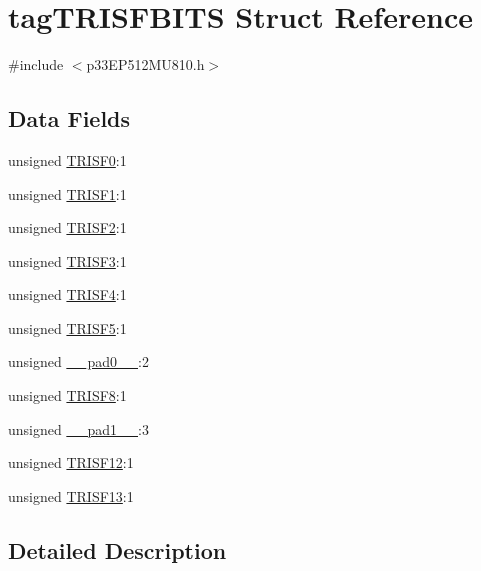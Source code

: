 \hypertarget{structtag_t_r_i_s_f_b_i_t_s}{}\section{tag\+T\+R\+I\+S\+F\+B\+I\+TS Struct Reference}
\label{structtag_t_r_i_s_f_b_i_t_s}


{\ttfamily \#include $<$p33\+E\+P512\+M\+U810.\+h$>$}

\subsection*{Data Fields}
\begin{DoxyCompactItemize}
\item 
unsigned \hyperlink{structtag_t_r_i_s_f_b_i_t_s_a9920edafd6d6d945c550458621b85bfe}{T\+R\+I\+S\+F0}\+:1
\item 
unsigned \hyperlink{structtag_t_r_i_s_f_b_i_t_s_a9638a4790e6230e7cd74e0bfc6eaf46e}{T\+R\+I\+S\+F1}\+:1
\item 
unsigned \hyperlink{structtag_t_r_i_s_f_b_i_t_s_ae99835dd625ae320ac958031a05cd588}{T\+R\+I\+S\+F2}\+:1
\item 
unsigned \hyperlink{structtag_t_r_i_s_f_b_i_t_s_a9e15508a822cd719f82ca7822ce6c547}{T\+R\+I\+S\+F3}\+:1
\item 
unsigned \hyperlink{structtag_t_r_i_s_f_b_i_t_s_ac2f3b8aa17d94719dd11ac00e84f3005}{T\+R\+I\+S\+F4}\+:1
\item 
unsigned \hyperlink{structtag_t_r_i_s_f_b_i_t_s_ae18010975fa992db23e1d546be7b4e7f}{T\+R\+I\+S\+F5}\+:1
\item 
unsigned \hyperlink{structtag_t_r_i_s_f_b_i_t_s_adf71f3d8410c1f1dbbc96680a92c49af}{\+\_\+\+\_\+pad0\+\_\+\+\_\+}\+:2
\item 
unsigned \hyperlink{structtag_t_r_i_s_f_b_i_t_s_a171ff069efd581df84fd1fe5eb987d41}{T\+R\+I\+S\+F8}\+:1
\item 
unsigned \hyperlink{structtag_t_r_i_s_f_b_i_t_s_acaf2d0924a107ec6e8d2e31febaf66f9}{\+\_\+\+\_\+pad1\+\_\+\+\_\+}\+:3
\item 
unsigned \hyperlink{structtag_t_r_i_s_f_b_i_t_s_a77bafa6377392ff9ee02d9b28931dcf6}{T\+R\+I\+S\+F12}\+:1
\item 
unsigned \hyperlink{structtag_t_r_i_s_f_b_i_t_s_a0403c7aeab3ac614895561fa49ba6e54}{T\+R\+I\+S\+F13}\+:1
\end{DoxyCompactItemize}


\subsection{Detailed Description}


